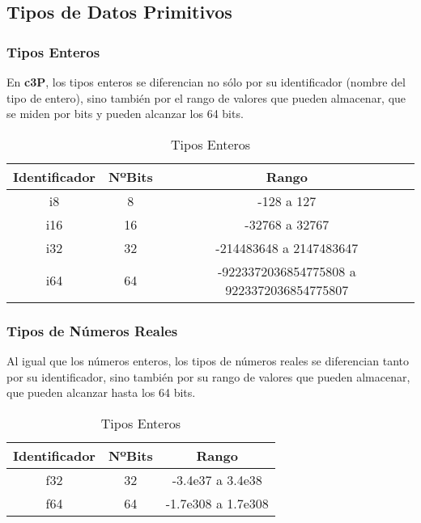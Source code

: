 \subsection{Tipos de Datos Primitivos}
\subsubsection{Tipos Enteros}

En \textbf{c3P}, los tipos enteros se diferencian no sólo por su identificador (nombre del
tipo de entero), sino también por el rango de valores que pueden almacenar, que se miden
por bits y pueden alcanzar los 64 bits.

\begin{table}[H]
    \centering
    \begin{tabular}{|c|c|c|}
         \hline
         \textbf{Identificador} & \textbf{NºBits} & \textbf{Rango} \\
         \hline
         i8 & 8 & -128 a 127 \\
         \hline
         i16 & 16 & -32768 a 32767 \\
         \hline
         i32 & 32 & -214483648 a 2147483647 \\
         \hline
         i64 & 64 & -9223372036854775808 a 9223372036854775807 \\
         \hline
    \end{tabular}
    \caption{Tipos Enteros}
    \label{tab:tab_tipos_enteros}
\end{table}

\subsubsection{Tipos de Números Reales}

Al igual que los números enteros, los tipos de números reales se diferencian tanto
por su identificador, sino también por su rango de valores que pueden almacenar,
que pueden alcanzar hasta los 64 bits.

\begin{table}[H]
    \centering
    \begin{tabular}{|c|c|c|}
         \hline
         \textbf{Identificador} & \textbf{NºBits} & \textbf{Rango} \\
         \hline
         f32 & 32 & -3.4e37 a 3.4e38 \\
         \hline
         f64 & 64 & -1.7e308 a 1.7e308 \\
         \hline
    \end{tabular}
    \caption{Tipos Enteros}
    \label{tab:tab_tipos_decimales}
\end{table}


